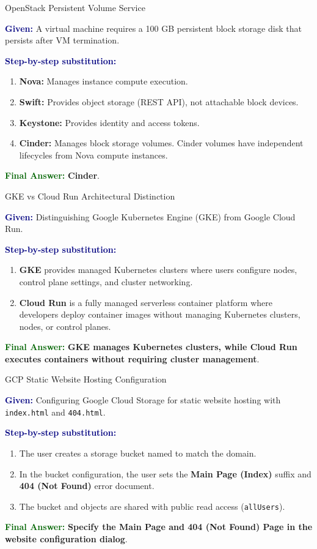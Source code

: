 \documentclass[11pt,a4paper,openany]{report}
\newcommand{\Given}{\par\textbf{\textcolor{navy}{Given:}} }
\newcommand{\Steps}{\par\textbf{\textcolor{navy}{Step-by-step substitution:}}\par}
\newcommand{\Answer}{\par\textbf{\textcolor{darkgreen}{Final Answer:}} }
\begin{document}
\begin{solved}{OpenStack Persistent Volume Service}
\Given A virtual machine requires a 100 GB persistent block storage disk that persists after VM termination.
\Steps
\begin{enumerate}[leftmargin=*]
  \item \textbf{Nova:} Manages instance compute execution.
  \item \textbf{Swift:} Provides object storage (REST API), not attachable block devices.
  \item \textbf{Keystone:} Provides identity and access tokens.
  \item \textbf{Cinder:} Manages block storage volumes. Cinder volumes have independent lifecycles from Nova compute instances.
\end{enumerate}
\Answer \textbf{Cinder}.
\end{solved}

\begin{solved}{GKE vs Cloud Run Architectural Distinction}
\Given Distinguishing Google Kubernetes Engine (GKE) from Google Cloud Run.
\Steps
\begin{enumerate}[leftmargin=*]
  \item \textbf{GKE} provides managed Kubernetes clusters where users configure nodes, control plane settings, and cluster networking.
  \item \textbf{Cloud Run} is a fully managed serverless container platform where developers deploy container images without managing Kubernetes clusters, nodes, or control planes.
\end{enumerate}
\Answer \textbf{GKE manages Kubernetes clusters, while Cloud Run executes containers without requiring cluster management}.
\end{solved}

\begin{solved}{GCP Static Website Hosting Configuration}
\Given Configuring Google Cloud Storage for static website hosting with \texttt{index.html} and \texttt{404.html}.
\Steps
\begin{enumerate}[leftmargin=*]
  \item The user creates a storage bucket named to match the domain.
  \item In the bucket configuration, the user sets the \textbf{Main Page (Index)} suffix and \textbf{404 (Not Found)} error document.
  \item The bucket and objects are shared with public read access (\texttt{allUsers}).
\end{enumerate}
\Answer \textbf{Specify the Main Page and 404 (Not Found) Page in the website configuration dialog}.
\end{solved}
\end{document}
